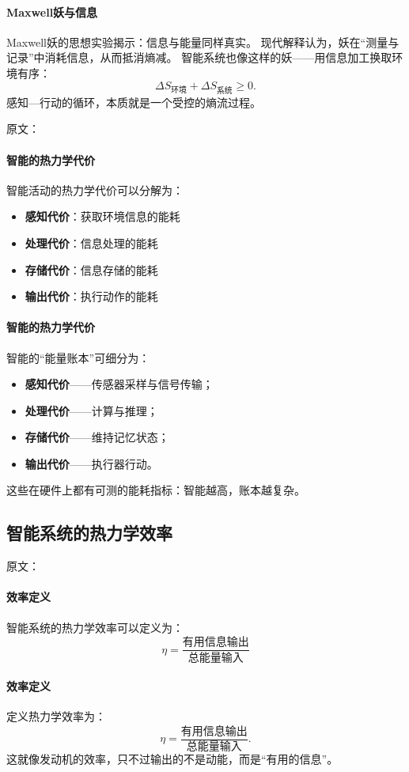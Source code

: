 \paragraph{Maxwell妖与信息}
Maxwell妖的思想实验揭示：\;信息与能量同样真实。  
现代解释认为，妖在“测量与记录”中消耗信息，从而抵消熵减。  
智能系统也像这样的妖——\;用信息加工换取环境有序：
$$\Delta S_{\text{环境}}+\Delta S_{\text{系统}}\ge0.$$
感知—行动的循环，本质就是一个受控的熵流过程。

原文：
\paragraph{智能的热力学代价}
智能活动的热力学代价可以分解为：
\begin{itemize}
\item \textbf{感知代价}：获取环境信息的能耗
\item \textbf{处理代价}：信息处理的能耗
\item \textbf{存储代价}：信息存储的能耗
\item \textbf{输出代价}：执行动作的能耗
\end{itemize}
\paragraph{智能的热力学代价}
智能的“能量账本”可细分为：
\begin{itemize}
\item \textbf{感知代价}——传感器采样与信号传输；
\item \textbf{处理代价}——计算与推理；
\item \textbf{存储代价}——维持记忆状态；
\item \textbf{输出代价}——执行器行动。
\end{itemize}
这些在硬件上都有可测的能耗指标：智能越高，账本越复杂。

\subsection{智能系统的热力学效率}

原文：
\paragraph{效率定义}
智能系统的热力学效率可以定义为：
$$\eta = \frac{\text{有用信息输出}}{\text{总能量输入}}$$
\paragraph{效率定义}
定义热力学效率为：
$$\eta=\frac{\text{有用信息输出}}{\text{总能量输入}}.$$
这就像发动机的效率，只不过输出的不是动能，而是“有用的信息”。

